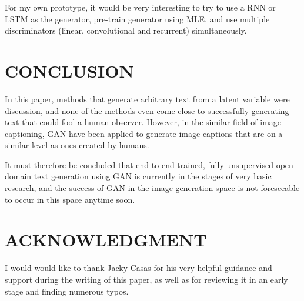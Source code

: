 \documentclass[a4paper,conference]{IEEEtran}
\begin{document}
For my own prototype, it would be very interesting to try to use a RNN or LSTM as the generator, pre-train generator using MLE, and use multiple discriminators (linear, convolutional and recurrent) simultaneously. 

\section{CONCLUSION}
In this paper, methods that generate arbitrary text from a latent variable were discussion, and none of the methods even come close to successfully generating text that could fool a human observer. However, in the similar field of image captioning, GAN have been applied to generate image captions that are on a similar level as ones created by humans.

It must therefore be concluded that end-to-end trained, fully unsupervised open-domain text generation using GAN is currently in the stages of very basic research, and the success of GAN in the image generation space is not foreseeable to occur in this space anytime soon.

\section*{ACKNOWLEDGMENT}

I would would like to thank Jacky Casas for his very helpful guidance and support during the writing of this paper, as well as for reviewing it in an early stage and finding numerous typos.


%
%
\end{document}
